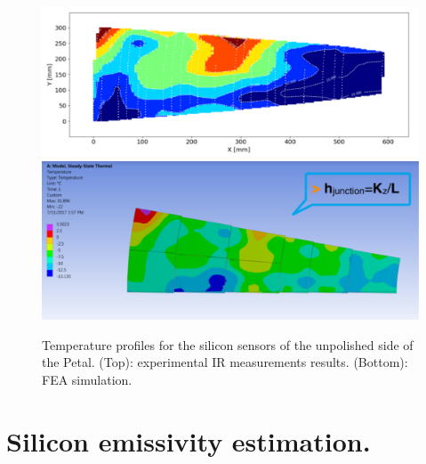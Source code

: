 		\begin{figure}[ht!]
			\centering
			\captionsetup{justification=centering,margin=0cm}
			\includegraphics[scale=0.35]{Figures/Chapter04/PetalLinearInterpolation.pdf}
			\includegraphics[scale=0.35]{Figures/Chapter04/PetalFEA.pdf}
			\caption{Temperature profiles for the silicon sensors of the unpolished side of the Petal. (Top): experimental IR measurements results. (Bottom): FEA simulation.}\label{fig4.3}
		\end{figure}
	
	\section{Silicon emissivity estimation.}\label{section4.3}
	
